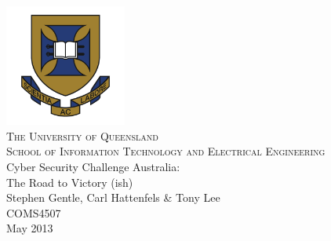 \documentclass[11pt,a4paper,oneside]{book}
\begin{document}
\frontmatter

\begin{titlepage}
\begin{center}
\includegraphics[width=0.3\textwidth]{images/UQlogo}\\[0.3cm]

\textsc{\LARGE The University of Queensland}\\[0.4cm]

\textsc{\Large School of Information Technology and Electrical Engineering}\\[2cm]

{\huge Cyber Security Challenge Australia:\\The Road to Victory (ish)}\\[1.8cm]

{\Large Stephen Gentle, Carl Hattenfels \& Tony Lee}\\[1.5cm]
{\large COMS4507}\\[0.5cm]
{\large May 2013}\\[5.4cm]

\end{center}

\end{titlepage}

\cleardoublepage



\tableofcontents
\listoffigures
\listoftables

\mainmatter











\clearpage
{}

\end{document}
